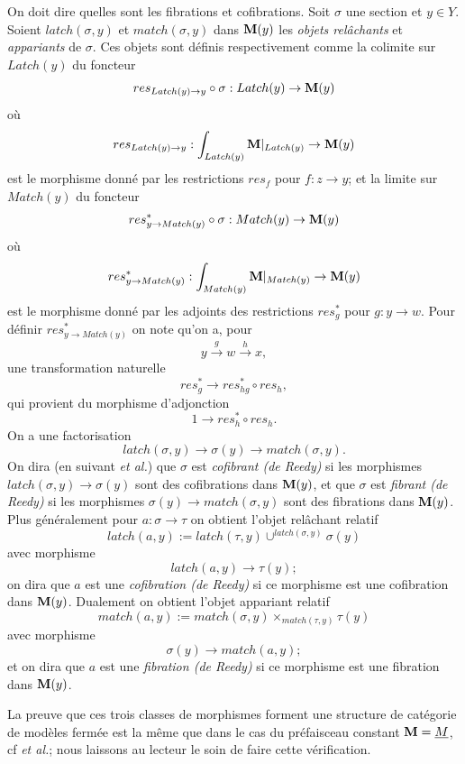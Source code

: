 \documentclass[12pt]{article}
\newcommand{\mm}{{\bf M}}
\begin{document}
On doit dire quelles sont les fibrations et cofibrations.
Soit $\sigma$ une section et $y\in Y$.
Soient $latch(\sigma , y)$ et $match(\sigma , y)$ dans $\mm (y)$ les {\em objets
rel\^achants} et {\em appariants} de $\sigma$. Ces objets sont d\'efinis
respectivement
comme la colimite sur $Latch(y)$ du foncteur
$$
res_{Latch(y)\rightarrow y} \circ \sigma : Latch(y)\rightarrow \mm (y)
$$
o\`u
$$
res_{Latch(y)\rightarrow y} : \int _{Latch(y)}\mm |_{Latch(y)} \rightarrow \mm
(y)
$$
est le morphisme donn\'e par les restrictions $res_f$ pour $f: z\rightarrow y$;
et la limite sur $Match(y)$ du foncteur
$$
res_{y\rightarrow Match(y)} ^{\ast}\circ \sigma : Match(y)\rightarrow \mm
(y)
$$
o\`u
$$
res_{y\rightarrow Match(y)}^{\ast} : \int _{Match(y)}\mm |_{Match(y)}
\rightarrow \mm (y)
$$
est le morphisme donn\'e par les adjoints des restrictions
$res_g^{\ast}$ pour $g: y\rightarrow w$.
Pour d\'efinir $res_{y\rightarrow Match(y)}^{\ast}$  on note qu'on a, pour
$$
y\stackrel{g}{\rightarrow} w \stackrel{h}{\rightarrow} x,
$$
une transformation naturelle
$$
res_g^{\ast} \rightarrow res _{hg}^{\ast} \circ res_h,
$$
qui provient du morphisme d'adjonction
$$
1\rightarrow res_h^{\ast} \circ res_h.
$$
On a une factorisation
$$
latch(\sigma ,y)\rightarrow \sigma (y) \rightarrow match(\sigma , y).
$$
On dira (en suivant \cite{Reedy} \cite{Hirschhorn} \cite{DHK} {\em et al.}) que
$\sigma$ est {\em cofibrant (de Reedy)} si les morphismes  $latch(\sigma
,y)\rightarrow \sigma (y)$  sont des cofibrations dans $\mm (y)$, et que
$\sigma$
est  {\em fibrant (de Reedy)} si
les morphismes $\sigma (y)\rightarrow match(\sigma ,y)$ sont des fibrations dans
$\mm (y)$. Plus g\'en\'eralement pour $a:\sigma \rightarrow \tau$
on obtient l'objet rel\^achant relatif
$$
latch(a,y):= latch(\tau , y) \cup ^{latch(\sigma , y)}\sigma (y)
$$
avec morphisme
$$
latch (a,y)\rightarrow \tau (y);
$$
on dira que $a$ est une {\em cofibration (de Reedy)} si ce morphisme est une
cofibration dans $\mm (y)$. Dualement on obtient l'objet appariant relatif
$$
match (a,y):= match (\sigma ,y)\times _{match(\tau , y)}\tau (y)
$$
avec morphisme
$$
\sigma (y)\rightarrow match(a,y);
$$
et on dira que $a$ est une {\em fibration (de Reedy)} si ce morphisme est une
fibration dans $\mm (y)$.

La preuve que ces trois classes de morphismes forment une structure de
cat\'egorie
de mod\`eles ferm\'ee est la m\^eme que dans le cas du pr\'efaisceau
constant $\mm =\underline{M}$, cf \cite{Reedy} \cite{Hirschhorn} {\em et al.};
nous laissons au lecteur le soin de faire cette v\'erification.
\end{document}
